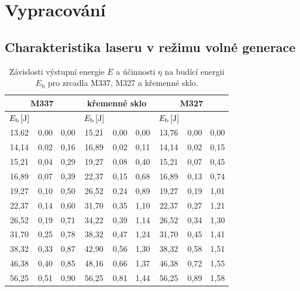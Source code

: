 			
\section{Vypracování}
\subsection{Charakteristika laseru v režimu volné generace}

\begin{table}[!hbt]
\centering
	\begin{tabular}{|c|c|c||c|c|c||c|c|c|}
		\hline
		\multicolumn{3}{|c||}{M337}					&	\multicolumn{3}{c||}{křemenné sklo}					&	\multicolumn{3}{c|}{M327}					\\ \hline
$E_\mathrm{b}\,[\mathrm{J}]$	&	\tabh{E}{J}	&	\tabh{\eta}{\%}	&	$E_\mathrm{b}\,[\mathrm{J}]$	&	\tabh{E}{J}	&	\tabh{\eta}{\%}	&	$E_\mathrm{b}\,[\mathrm{J}]$	&	\tabh{E}{J}	&	\tabh{\eta}{\%}	\\ \hline \hline
13,62	&	0,00	&	0,00	&	15,21	&	0,00	&	0,00	&	13,76	&	0,00	&	0,00	\\ \hline
14,14	&	0,02	&	0,16	&	16,89	&	0,02	&	0,11	&	14,14	&	0,02	&	0,15	\\ \hline
15,21	&	0,04	&	0,29	&	19,27	&	0,08	&	0,40	&	15,21	&	0,07	&	0,45	\\ \hline
16,89	&	0,07	&	0,39	&	22,37	&	0,15	&	0,68	&	16,89	&	0,13	&	0,74	\\ \hline
19,27	&	0,10	&	0,50	&	26,52	&	0,24	&	0,89	&	19,27	&	0,19	&	1,01	\\ \hline
22,37	&	0,14	&	0,60	&	31,70	&	0,35	&	1,10	&	22,37	&	0,27	&	1,21	\\ \hline
26,52	&	0,19	&	0,71	&	34,22	&	0,39	&	1,14	&	26,52	&	0,34	&	1,30	\\ \hline
31,70	&	0,25	&	0,78	&	38,32	&	0,47	&	1,24	&	31,70	&	0,45	&	1,41	\\ \hline
38,32	&	0,33	&	0,87	&	42,90	&	0,56	&	1,30	&	38,32	&	0,58	&	1,51	\\ \hline
46,38	&	0,40	&	0,85	&	48,16	&	0,66	&	1,37	&	46,38	&	0,72	&	1,55	\\ \hline
56,25	&	0,51	&	0,90	&	56,25	&	0,81	&	1,44	&	56,25	&	0,89	&	1,58	\\ \hline

	\end{tabular}
	\caption{Závislosti výstupní energie $E$ a účinnosti $\eta$ na budící energii $E_\mathrm{b}$ pro zrcadla M337, M327 a křemenné sklo.}
	\label{tab:ucinnost_zrcadla}
\end{table}

